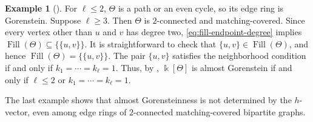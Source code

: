 \documentclass[a4paper,reqno,11pt]{amsart}
\theoremstyle{definition}
\newtheorem{ex}[thm]{Example}
\theoremstyle{remark}
\numberwithin{equation}{section}
\newcommand{\kk}{\Bbbk}
\newcommand{\Fill}{\operatorname{Fill}}
\begin{document}
\begin{ex}[{\cite{higashitani2023h,bhaskara2026h}}]
    For $\ell\le2$, $\Theta$ is a path or an even cycle, so its edge ring is Gorenstein.
    Suppose $\ell\ge3$.
    Then $\Theta$ is $2$-connected and matching-covered.
    Since every vertex other than $u$ and $v$ has degree two, \eqref{eq:fill-endpoint-degree} implies
    $\Fill(\Theta)\subseteq\{\{u,v\}\}$.
    It is straightforward to check that $\{u,v\}\in\Fill(\Theta)$, and hence $\Fill(\Theta)=\{\{u,v\}\}$.
    The pair $\{u,v\}$ satisfies the neighborhood condition if and only if $k_1=\cdots=k_\ell=1$.
    Thus, by , $\kk[\Theta]$ is almost Gorenstein if and only if $\ell\le2$ or $k_1=\cdots=k_\ell=1$.

\end{ex}

The last example shows that almost Gorensteinness is not determined by the $h$-vector, even among edge rings of $2$-connected matching-covered bipartite graphs.
\end{document}
